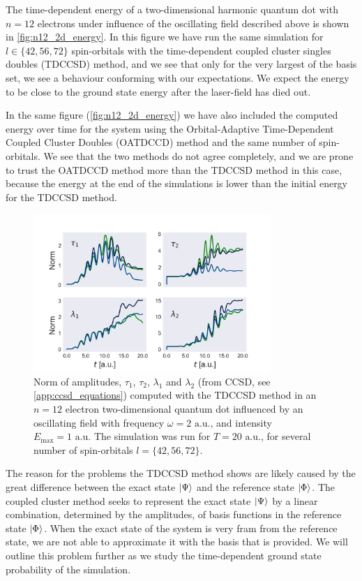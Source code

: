 The time-dependent energy of a two-dimensional harmonic quantum dot with $n=12$
electrons under influence of the oscillating field described above is shown in 
\autoref{fig:n12_2d_energy}. In this figure we have run the same simulation for 
$l\in\{42,56,72\}$ spin-orbitals with the time-dependent coupled cluster 
singles doubles (TDCCSD) method, and we see that only for the very largest of the 
basis set, we see a behaviour conforming with our expectations. We expect the 
energy to be close to the ground state energy after the laser-field has died out.

In the same figure (\autoref{fig:n12_2d_energy}) we have also included
the computed energy over time for the system using the
Orbital-Adaptive Time-Dependent Coupled Cluster Doubles (OATDCCD) method and the 
same number of spin-orbitals.
We see that the two methods do not agree completely, and we are prone to trust 
the OATDCCD method more than the TDCCSD method in this case, because the energy at 
the end of the simulations is lower than the initial energy for the TDCCSD method.

\begin{figure}
    \centering
    \includegraphics[width=0.8\textwidth]{results/figures/2D/n=12_amplitudes.png}
    \caption{Norm of amplitudes, $\tau_1$, $\tau_2$, $\lambda_1$ and
        $\lambda_2$ (from CCSD, see \autoref{app:ccsd_equations})
        computed with the TDCCSD method in an $n=12$ electron
        two-dimensional quantum 
        dot influenced by an oscillating field with frequency $\omega = 2 \text{ a.u.}$,
        and intensity $E_\text{max} = 1 \text{ a.u.}$ The simulation was run for 
        $T = 20 \text{ a.u.}$, for several number of 
        spin-orbitals $l=\{42,56,72\}$. 
    }
    \label{fig:n12_2d_amp_norms}
\end{figure}

The reason for the problems the TDCCSD method shows are likely caused by the 
great difference between the exact state $\ket{\Psi}$ and the reference state 
$\ket{\Phi}$. The coupled cluster method seeks to represent the exact state 
$\ket{\Psi}$ by a linear combination, determined by the amplitudes, of basis functions 
in the reference state $\ket{\Phi}$. When the exact state of the system is very 
fram from the reference state, we are not able to approximate it with the basis that 
is provided. We will outline this problem further as we study the time-dependent 
ground state probability of the simulation.

